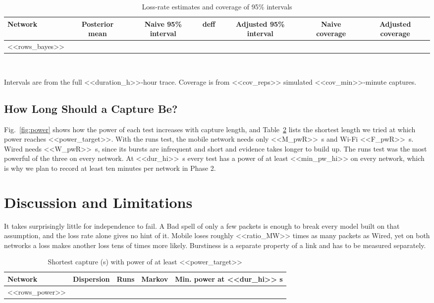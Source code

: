 \documentclass[conference]{IEEEtran}
\begin{document}
\begin{table}[!t]
\caption{Loss-rate estimates and coverage of 95\% intervals}
\label{tab:bayes}
\centering
\footnotesize
\setlength{\tabcolsep}{8pt}
\begin{tabular}{lcccccc}
\toprule
Network & Posterior mean & Naive 95\% interval & deff & Adjusted 95\% interval & Naive coverage & Adjusted coverage \\
\midrule
<<rows_bayes>>
\bottomrule
\end{tabular}
\\[2pt]
\raggedright\scriptsize Intervals are from the full <<duration_h>>-hour trace. Coverage is from <<cov_reps>> simulated <<cov_min>>-minute captures.
\end{table}

\subsection{How Long Should a Capture Be?}
Fig.~\ref{fig:power} shows how the power of each test increases with capture length, and Table~\ref{tab:power} lists the shortest length we tried at which power reaches <<power_target>>. With the runs test, the mobile network needs only <<M_pwR>>~s and Wi-Fi <<F_pwR>>~s. Wired needs <<W_pwR>>~s, since its bursts are infrequent and short and evidence takes longer to build up. The runs test was the most powerful of the three on every network. At <<dur_hi>>~s every test has a power of at least <<min_pw_hi>> on every network, which is why we plan to record at least ten minutes per network in Phase 2.

\section{Discussion and Limitations}
It takes surprisingly little for independence to fail. A Bad spell of only a few packets is enough to break every model built on that assumption, and the loss rate alone gives no hint of it. Mobile loses roughly <<ratio_MW>> times as many packets as Wired, yet on both networks a loss makes another loss tens of times more likely. Burstiness is a separate property of a link and has to be measured separately.

\begin{table}[!t]
\caption{Shortest capture (s) with power of at least <<power_target>>}
\label{tab:power}
\centering
\footnotesize
\begin{tabular}{lcccc}
\toprule
Network & Dispersion & Runs & Markov & Min. power at <<dur_hi>> s \\
\midrule
<<rows_power>>
\bottomrule
\end{tabular}
\end{table}
\end{document}

